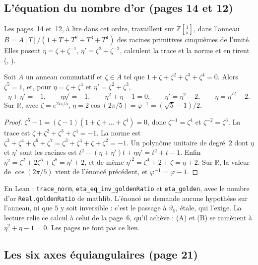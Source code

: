 \subsection*{L'équation du nombre d'or (pages 14 et 12)}

Les pages~14 et~12, à lire dans cet ordre, travaillent sur $\mathbb Z[\tfrac15]$, dans l'anneau $B = A[T]/(1 + T + T^2 + T^3 + T^4)$ des racines primitives cinquièmes de l'unité. Elles posent $\eta = \zeta + \zeta^{-1}$, $\eta' = \zeta^2 + \zeta^{-2}$, calculent la trace et la norme et en tirent  (, ).

\begin{enonce}[Pages 14 et 12]
Soit $A$ un anneau commutatif et $\zeta \in A$ tel que $1 + \zeta + \zeta^2 + \zeta^3 + \zeta^4 = 0$. Alors $\zeta^5 = 1$, et, pour $\eta = \zeta + \zeta^4$ et $\eta' = \zeta^2 + \zeta^3$,
\[
\eta + \eta' = -1, \qquad \eta\eta' = -1, \qquad \eta^2 + \eta - 1 = 0, \qquad \eta' = \eta^2 - 2, \qquad \eta = \eta'^2 - 2.
\]
Sur $\mathbb R$, avec $\zeta = e^{2i\pi/5}$, $\eta = 2\cos(2\pi/5) = \varphi^{-1} = (\sqrt5 - 1)/2$.
\end{enonce}

\begin{proof}
$\zeta^5 - 1 = (\zeta - 1)(1 + \zeta + \dots + \zeta^4) = 0$, donc $\zeta^{-1} = \zeta^4$ et $\zeta^{-2} = \zeta^3$. La trace est $\zeta + \zeta^2 + \zeta^3 + \zeta^4 = -1$. La norme est $\zeta^3 + \zeta^4 + \zeta^6 + \zeta^7 = \zeta^3 + \zeta^4 + \zeta + \zeta^2 = -1$. Un polynôme unitaire de degré~$2$ dont $\eta$ et $\eta'$ sont les racines est $t^2 - (\eta + \eta')t + \eta\eta' = t^2 + t - 1$. Enfin $\eta^2 = \zeta^2 + 2\zeta^5 + \zeta^8 = \eta' + 2$, et de même $\eta'^2 = \zeta^4 + 2 + \zeta = \eta + 2$. Sur $\mathbb R$, la valeur de $\cos(2\pi/5)$ vient de l'énoncé précédent, et $\varphi^{-1} = \varphi - 1$.
\end{proof}

\noindent En Lean : \texttt{trace\_norm}, \texttt{eta\_eq\_inv\_goldenRatio} et \texttt{eta\_golden}, avec le nombre d'or \texttt{Real.goldenRatio} de mathlib. L'énoncé ne demande aucune hypothèse sur l'anneau, ni que $5$ y soit inversible : c'est le passage à $\vartheta_5$, étale, qui l'exige. La lecture relie ce calcul à celui de la page~6, qu'il achève : (A) et (B) se ramènent à $\eta^2 + \eta - 1 = 0$. Les pages ne font pas ce lien.

\subsection*{Les six axes équiangulaires (page 21)}

